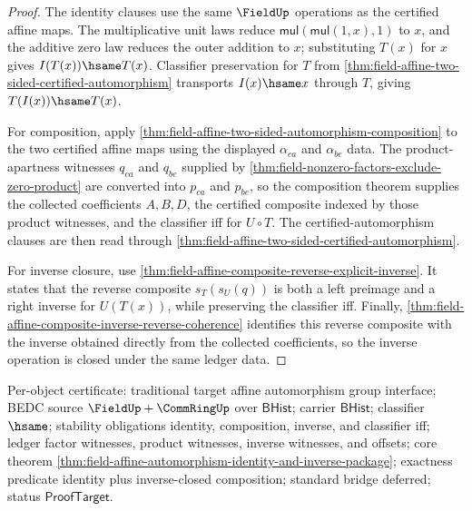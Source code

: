 \begin{proof}
The identity clauses use the same $\FieldUp$ operations as the certified affine
maps. The multiplicative unit laws reduce $\mathsf{mul}(\mathsf{mul}(1,x),1)$
to $x$, and the additive zero law reduces the outer addition to $x$; substituting
$T(x)$ for $x$ gives $I(T(x))\hsame T(x)$. Classifier preservation for $T$ from
\autoref{thm:field-affine-two-sided-certified-automorphism} transports
$I(x)\hsame x$ through $T$, giving $T(I(x))\hsame T(x)$.

For composition, apply
\autoref{thm:field-affine-two-sided-automorphism-composition} to the two
certified affine maps using the displayed $\alpha_{ca}$ and $\alpha_{be}$ data.
The product-apartness witnesses $q_{ca}$ and $q_{be}$ supplied by
\autoref{thm:field-nonzero-factors-exclude-zero-product} are converted into
$p_{ca}$ and $p_{be}$, so the composition theorem supplies the collected
coefficients $A,B,D$, the certified composite indexed by those product
witnesses, and the classifier iff for $U\circ T$. The certified-automorphism
clauses are then read through
\autoref{thm:field-affine-two-sided-certified-automorphism}.

For inverse closure, use
\autoref{thm:field-affine-composite-reverse-explicit-inverse}. It states that
the reverse composite $s_T(s_U(q))$ is both a left preimage and a right inverse
for $U(T(x))$, while preserving the classifier iff. Finally,
\autoref{thm:field-affine-composite-inverse-reverse-coherence} identifies this
reverse composite with the inverse obtained directly from the collected
coefficients, so the inverse operation is closed under the same ledger data.
\end{proof}

Per-object certificate: traditional target affine automorphism group interface;
BEDC source $\FieldUp+\CommRingUp$ over $\mathsf{BHist}$; carrier
$\mathsf{BHist}$; classifier $\hsame$; stability obligations identity,
composition, inverse, and classifier iff; ledger factor witnesses, product
witnesses, inverse witnesses, and offsets; core theorem
\autoref{thm:field-affine-automorphism-identity-and-inverse-package};
exactness predicate identity plus inverse-closed composition; standard bridge
deferred; status $\mathsf{ProofTarget}$.


